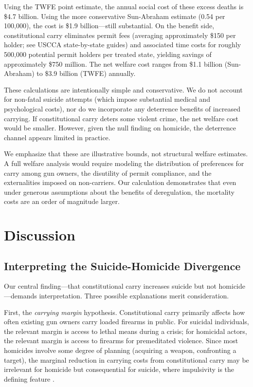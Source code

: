 \documentclass[12pt]{article}
\begin{document}


Using the TWFE point estimate, the annual social cost of these excess deaths is \$4.7 billion. Using the more conservative Sun-Abraham estimate (0.54 per 100,000), the cost is \$1.9 billion---still substantial. On the benefit side, constitutional carry eliminates permit fees (averaging approximately \$150 per holder; see USCCA state-by-state guides) and associated time costs for roughly 500,000 potential permit holders per treated state, yielding savings of approximately \$750 million. The net welfare cost ranges from \$1.1 billion (Sun-Abraham) to \$3.9 billion (TWFE) annually.

These calculations are intentionally simple and conservative. We do not account for non-fatal suicide attempts (which impose substantial medical and psychological costs), nor do we incorporate any deterrence benefits of increased carrying. If constitutional carry deters some violent crime, the net welfare cost would be smaller. However, given the null finding on homicide, the deterrence channel appears limited in practice.

We emphasize that these are illustrative bounds, not structural welfare estimates. A full welfare analysis would require modeling the distribution of preferences for carry among gun owners, the disutility of permit compliance, and the externalities imposed on non-carriers. Our calculation demonstrates that even under generous assumptions about the benefits of deregulation, the mortality costs are an order of magnitude larger.


\section{Discussion}\label{sec:discussion}

\subsection{Interpreting the Suicide-Homicide Divergence}

Our central finding---that constitutional carry increases suicide but not homicide---demands interpretation. Three possible explanations merit consideration.

First, the \textit{carrying margin} hypothesis. Constitutional carry primarily affects how often existing gun owners carry loaded firearms in public. For suicidal individuals, the relevant margin is access to lethal means during a crisis; for homicidal actors, the relevant margin is access to firearms for premeditated violence. Since most homicides involve some degree of planning (acquiring a weapon, confronting a target), the marginal reduction in carrying costs from constitutional carry may be irrelevant for homicide but consequential for suicide, where impulsivity is the defining feature \citep{simon2001characteristics}.
\end{document}
